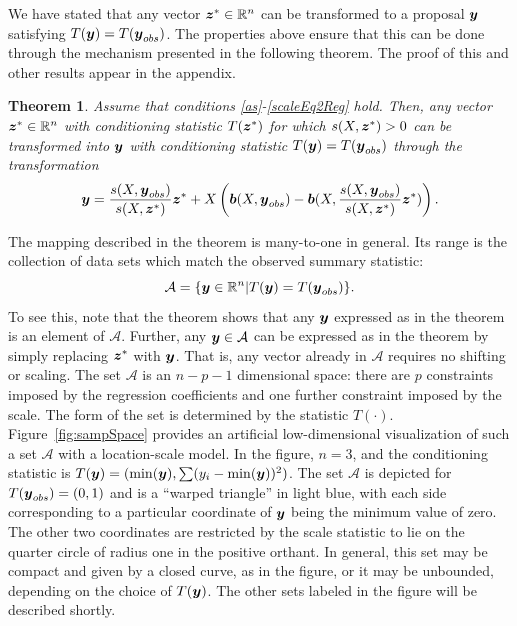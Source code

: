 \documentclass[12pt]{article}
\newcommand{\by}{\mbox{\boldmath $y$}}
\newcommand{\bz}{\mbox{\boldmath $z$}}
\newcommand{\bb}{\mbox{\boldmath $b$}}
\newcommand{\mc}{\mathcal}
\newtheorem{theorem}{Theorem}[section]
\newcommand{\green}[1]{{\color{green}#1}}
\begin{document}
We have stated that any vector $\bz^{*} \in \mathbb{R}^n$ can be transformed to a proposal
$\by$ satisfying $T(\by) = T(\by_{obs})$.  The properties above ensure
that this can be done through the mechanism presented in the following theorem.  The proof of this and other results appear in the appendix.
\begin{theorem}
\label{Transformation}
Assume that conditions \ref{as}-\ref{scaleEq2Reg} hold.  Then, any vector $\bz^* \in \mathbb{R}^n$ with conditioning statistic
$T(\bz^*)$ \green{for which $s(X,\bz^*) > 0$} can be transformed into $\by$ with conditioning statistic $T(\by) = T(\by_{obs})$ 
through the transformation 
\[
\by = \frac{s(X,\by_{obs})}{s(X,\bz^*)} \bz^* + X\left(\bb(X,\by_{obs}) - \bb(X,\frac{s(X,\by_{obs})}{s(X,\bz^*)} \bz^*)\right) .  
\]
\end{theorem}
The mapping described in the theorem is many-to-one in general.
Its range is the collection of data sets which match
the observed summary statistic:
\begin{equation}
\label{sampleSpace}
 \mathcal{A}=\{\by\in \mathbb{R}^n | T(\by)=T(\by_{obs})\}.
\end{equation}
To see this, note that the theorem shows that any $\by$ expressed as in the theorem is an element of $\mc A$. Further, any $\by \in \mc A$ can be expressed as in the theorem by simply replacing $\bz^{*}$ with $\by$. That is, any vector already in $\mc A$ requires no shifting or scaling. The set $\mathcal{A}$ is an $n - p - 1$ dimensional space: 
there are $p$ constraints imposed by the regression coefficients and one further constraint imposed by the scale.  
The form of the set is determined by the statistic $T(\cdot)$.  Figure~\ref{fig:sampSpace} 
provides an artificial low-dimensional
visualization of such a set $\mathcal{A}$ with a location-scale
  model.  In the figure, $n = 3$, and the conditioning
statistic is $T(\by)=(\min(\by), \sum (y_i - \min(\by))^2)$. The
set $\mathcal{A}$ is depicted  for $T(\by_{obs})=(0,1)$ and is a
``warped triangle'' in light blue, with each side
corresponding to a particular coordinate of $\by$ being the minimum
value \green{of} zero. The other two coordinates are restricted by the scale
statistic to lie on the quarter circle of radius one in the positive
orthant. In general, this set may be compact and given by a closed
curve, as in the figure, or it may be unbounded, depending on the
  choice of $T(\by)$.  The other sets labeled in the figure will be described shortly.
\end{document}
